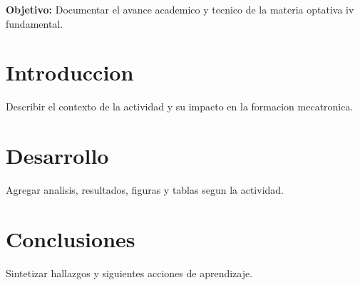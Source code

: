 \documentclass[spanish,letterpaper,oneside]{article}
\begin{document}
\templatePortrait
\templatePagecfg
\onehalfspacing

\begin{abstractd}
\textbf{Objetivo:} Documentar el avance academico y tecnico de la materia optativa iv fundamental.
\end{abstractd}

\templateIndex
\templateFinalcfg

\section{Introduccion}
Describir el contexto de la actividad y su impacto en la formacion mecatronica.

\section{Desarrollo}
Agregar analisis, resultados, figuras y tablas segun la actividad.

\section{Conclusiones}
Sintetizar hallazgos y siguientes acciones de aprendizaje.



\end{document}
